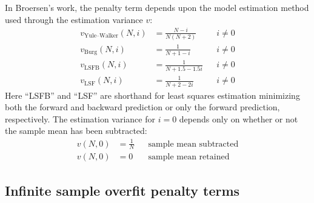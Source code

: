 \documentclass[12pt,letterpaper]{article}
\begin{document}
In Broersen's work, the penalty term depends upon the model estimation
method used through the estimation variance $v$:
\begin{subequations}
\label{eq:v1}
\begin{align}
    v_\text{Yule--Walker}\!\left(N,i\right) &= \frac{N-i}{N\left(N+2\right)}
    &
    &i \neq 0
    \\
    v_\text{Burg}\!\left(N,i\right) &= \frac{1}{N + 1 - i}
    &
    &i \neq 0
    \\
    v_\text{LSFB}\!\left(N,i\right) &= \frac{1}{N + 1.5 - 1.5i}
    &
    &i \neq 0
    \\
    v_\text{LSF}\!\left(N,i\right)  &= \frac{1}{N + 2 - 2i}
    &
    &i \neq 0
\end{align}
\end{subequations}
Here ``LSFB'' and ``LSF'' are shorthand for least squares estimation minimizing
both the forward and backward prediction or only the forward prediction,
respectively.  The estimation variance for $i=0$ depends only on whether or not
the sample mean has been subtracted:
\begin{subequations}
\label{eq:v0}
\begin{align}
    v\!\left(N,0\right) &= \frac{1}{N}
    &
    &\text{sample mean subtracted}
    \\
    v\!\left(N,0\right) &= 0
    &
    &\text{sample mean retained}
\end{align}
\end{subequations}

\subsection*{Infinite sample overfit penalty terms}
\end{document}
